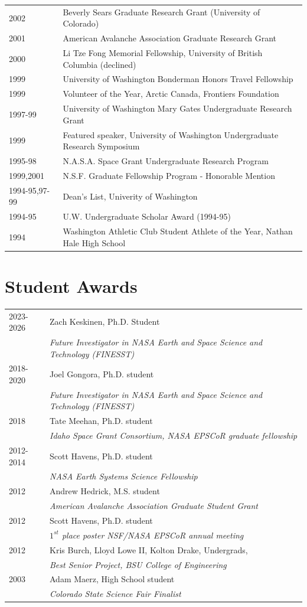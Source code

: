 \documentclass[11pt]{article}
\begin{document}
\begin{tabular}{ll}
2002 & Beverly Sears Graduate Research Grant (University of Colorado) \\
2001 & American Avalanche Association Graduate Research Grant \\
2000 & Li Tze Fong Memorial Fellowship, University of British Columbia (declined) \\
1999 & University of Washington Bonderman Honors Travel Fellowship \\
1999 & Volunteer of the Year, Arctic Canada, Frontiers Foundation \\
1997-99 & University of Washington Mary Gates Undergraduate Research Grant \\
1999 & Featured speaker, University of Washington Undergraduate Research Symposium \\
1995-98 & N.A.S.A. Space Grant Undergraduate Research Program \\
1999,2001 & N.S.F. Graduate Fellowship Program - Honorable Mention \\
1994-95,97-99 & Dean's List, Univerity of Washington \\
1994-95 & U.W. Undergraduate Scholar Award (1994-95) \\
1994 & Washington Athletic Club Student Athlete of the Year, Nathan Hale High School \\
\end{tabular}

\section*{Student Awards}
\begin{tabular}{ll}
2023-2026 & Zach Keskinen, Ph.D. Student \\ 
& \textit{Future Investigator in NASA Earth and Space Science and Technology (FINESST)} \\
2018-2020 & Joel Gongora, Ph.D. student \\
& \textit{Future Investigator in NASA Earth and Space Science and Technology (FINESST)} \\
2018 & Tate Meehan, Ph.D. student \\
& \textit{Idaho Space Grant Consortium, NASA EPSCoR graduate fellowship} \\
2012-2014 & Scott Havens, Ph.D. student \\
& \textit{NASA Earth Systems Science Fellowship} \\
2012 & Andrew Hedrick, M.S. student \\
& \textit{American Avalanche Association Graduate Student Grant} \\
2012 & Scott Havens, Ph.D. student \\
& \textit{$1^{st}$ place poster NSF/NASA EPSCoR annual meeting} \\
2012 & Kris Burch, Lloyd Lowe II, Kolton Drake, Undergrads, \\ 
& \textit{Best Senior Project, BSU College of Engineering} \\
2003 & Adam Maerz, High School student \\
& \textit{Colorado State Science Fair Finalist}
\end{tabular}
\end{document}
